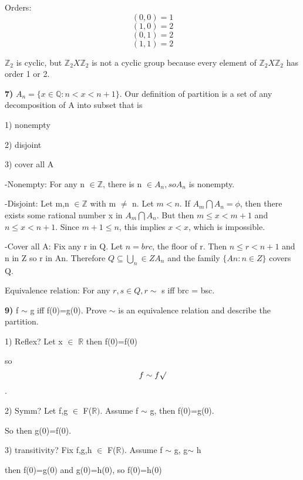 \documentclass{article}
\begin{document}
Orders: $$ (0,0)=1$$
$$(1,0)=2$$
$$(0,1)=2$$
$$(1,1)=2$$

$\mathbb{Z}_{2}$ is cyclic, but $\mathbb{Z}_{2}X\mathbb{Z}_{2}$ is not a cyclic group because every element of  $\mathbb{Z}_{2}X\mathbb{Z}_{2}$ has order 1 or 2.


\newpage
\textbf{7)} $A_{n}=\{x \in \mathbb{Q} : n <x < n+1\}$. Our definition of partition is a set of any decomposition of A into subset that is 

1) nonempty

2) disjoint

3) cover all A

\medskip

-Nonempty: For any n $\in \mathbb{Z}$, there is n $\in A_{n}, so  A_{n}$ is nonempty.
\medskip


-Disjoint: Let m,n $\in \mathbb{Z}$ with m $\neq$ n. Let  $m < n$. If $A_{m} \bigcap A_{n}= \phi$, then there exists
some rational number x in $ A_{m} \bigcap A_{n}$. But then $m \leq x < m + 1$ and $n \leq x < n + 1$. Since
$m + 1 \leq n$, this implies $x < x$, which is impossible.

\medskip

-Cover all A: Fix any r in Q. Let $n = brc$, the floor of r. Then $n \leq r < n + 1$ and n in Z so r in An.
Therefore $Q \subseteq \bigcup_{n} \in ZA_{n}$ and the family $\{An : n \in Z\}$ covers Q.


\medskip


Equivalence relation: For any $r, s \in Q, r \sim$ s iff brc = bsc.



\newpage

\textbf{9)} f $\sim$ g iff f(0)=g(0). Prove $\sim$ is an equivalence relation and describe the partition.

1) Reflex? Let x $\in$ $\mathbb{R}$ 
then f(0)=f(0)

so $$f \sim f \surd$$.

\medskip

2) Symm? Let f,g $\in$ F($\mathbb{R})$. Assume f $\sim$ g, then f(0)=g(0).

So then g(0)=f(0). 

\medskip

3) transitivity? Fix f,g,h $\in$ F($\mathbb{R})$. Assume f $\sim$ g, g$\sim$ h

then f(0)=g(0) and g(0)=h(0), so f(0)=h(0)
\end{document}
